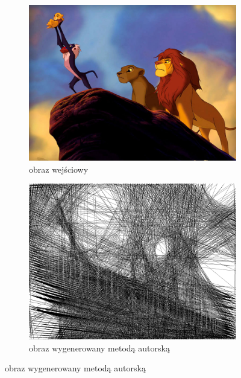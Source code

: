 	\begin{figure}[htb] 
    \centering
    \begin{subfigure}{0.40\textwidth}
        \centering
        \includegraphics[width = \textwidth]{img/7-sum/simba.jpg}
        \caption{obraz wejściowy\\\hphantom{ }}
        \label{sum-dev-simba-a}
    \end{subfigure}
    \begin{subfigure}{0.40\textwidth}
        \centering
        \includegraphics[width = \textwidth]{img/7-sum/simba_r_i1500_c15_inv0_bg5_obj2_ed1.png}
        \caption{obraz wygenerowany metodą autorską}
        \label{sum-dev-simba-b}
    \end{subfigure}

\end{figure}
